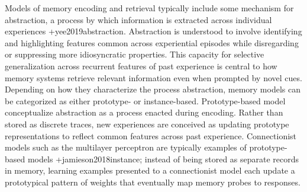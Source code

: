 Models of memory encoding and retrieval typically include some mechanism for abstraction, a process by which information is extracted across individual experiences +{}{}{yee2019abstraction}. Abstraction is understood to involve identifying and highlighting features common across experiential episodes while disregarding or suppressing more idiosyncratic properties. This capacity for selective generalization across recurrent features of past experience is central to how memory systems retrieve relevant information even when prompted by novel cues.\markdownRendererInterblockSeparator
{}Depending on how they characterize the process abstraction, memory models can be categorized as either prototype- or instance-based. Prototype-based model conceptualize abstraction as a process enacted during encoding. Rather than stored as discrete traces, new experiences are conceived as updating prototype representations to reflect common features across past experience. Connectionist models such as the multilayer perceptron are typically examples of prototype-based models +{}{}{jamieson2018instance}; instead of being stored as separate records in memory, learning examples presented to a connectionist model each update a prototypical pattern of weights that eventually map memory probes to responses.\relax